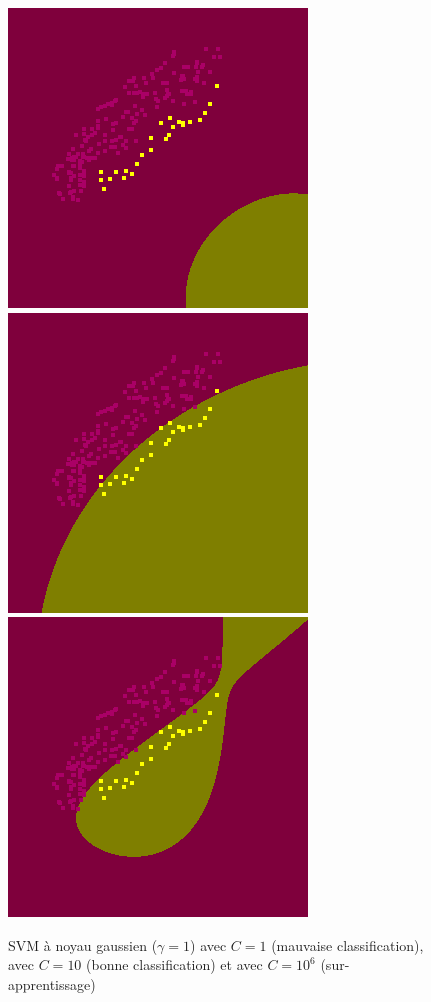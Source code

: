 \documentclass{book}
\begin{document}
\begin{figure}[H]
 \begin{center}
\includegraphics[scale=0.5]{images/svm/svm_g_1_1.png}
\includegraphics[scale=0.5]{images/svm/svm_g_1_10.png}
\includegraphics[scale=0.5]{images/svm/svm_g_1_1000000.png}
 \caption{SVM à noyau gaussien ($\gamma=1$) avec $C=1$ (mauvaise classification), avec $C=10$ (bonne classification) et avec $C=10^6$ (sur-apprentissage)}
 \label{svm_exemple}
 \end{center}
\end{figure}
\end{document}
